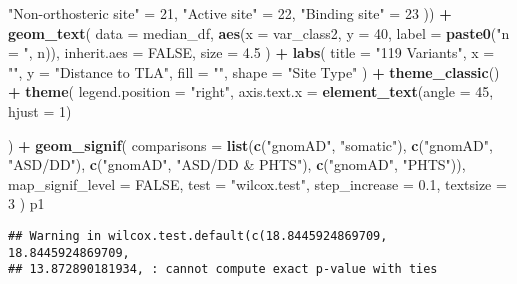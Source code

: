 \documentclass[
]{article}
\newenvironment{Shaded}{\begin{snugshade}}{\end{snugshade}}
\newcommand{\AttributeTok}[1]{\textcolor[rgb]{0.13,0.29,0.53}{#1}}
\newcommand{\ConstantTok}[1]{\textcolor[rgb]{0.56,0.35,0.01}{#1}}
\newcommand{\DecValTok}[1]{\textcolor[rgb]{0.00,0.00,0.81}{#1}}
\newcommand{\FloatTok}[1]{\textcolor[rgb]{0.00,0.00,0.81}{#1}}
\newcommand{\FunctionTok}[1]{\textcolor[rgb]{0.13,0.29,0.53}{\textbf{#1}}}
\newcommand{\NormalTok}[1]{#1}
\newcommand{\OtherTok}[1]{\textcolor[rgb]{0.56,0.35,0.01}{#1}}
\newcommand{\SpecialCharTok}[1]{\textcolor[rgb]{0.81,0.36,0.00}{\textbf{#1}}}
\newcommand{\StringTok}[1]{\textcolor[rgb]{0.31,0.60,0.02}{#1}}
\begin{document}
\begin{Shaded}
\begin{Highlighting}[]
  \StringTok{"Non{-}orthosteric site"} \OtherTok{=} \DecValTok{21}\NormalTok{,}
  \StringTok{"Active site"} \OtherTok{=} \DecValTok{22}\NormalTok{,}
  \StringTok{"Binding site"} \OtherTok{=} \DecValTok{23}
\NormalTok{)) }\SpecialCharTok{+}
  \FunctionTok{geom\_text}\NormalTok{(}
    \AttributeTok{data =}\NormalTok{ median\_df,}
    \FunctionTok{aes}\NormalTok{(}\AttributeTok{x =}\NormalTok{ var\_class2, }\AttributeTok{y =} \DecValTok{40}\NormalTok{, }\AttributeTok{label =} \FunctionTok{paste0}\NormalTok{(}\StringTok{"n = "}\NormalTok{, n)),}
    \AttributeTok{inherit.aes =} \ConstantTok{FALSE}\NormalTok{,}
    \AttributeTok{size =} \FloatTok{4.5}
\NormalTok{  ) }\SpecialCharTok{+}
  \FunctionTok{labs}\NormalTok{(}
    \AttributeTok{title =} \StringTok{"119 Variants"}\NormalTok{,}
    \AttributeTok{x =} \StringTok{""}\NormalTok{,}
    \AttributeTok{y =} \StringTok{"Distance to TLA"}\NormalTok{,}
    \AttributeTok{fill =} \StringTok{""}\NormalTok{,}
    \AttributeTok{shape =} \StringTok{"Site Type"}
\NormalTok{  ) }\SpecialCharTok{+}
  \FunctionTok{theme\_classic}\NormalTok{() }\SpecialCharTok{+}
  \FunctionTok{theme}\NormalTok{(}
    \AttributeTok{legend.position =} \StringTok{"right"}\NormalTok{,}
    \AttributeTok{axis.text.x =} \FunctionTok{element\_text}\NormalTok{(}\AttributeTok{angle =} \DecValTok{45}\NormalTok{, }\AttributeTok{hjust =} \DecValTok{1}\NormalTok{)}

\NormalTok{  ) }\SpecialCharTok{+}
  \FunctionTok{geom\_signif}\NormalTok{(}
    \AttributeTok{comparisons =} \FunctionTok{list}\NormalTok{(}\FunctionTok{c}\NormalTok{(}\StringTok{"gnomAD"}\NormalTok{, }\StringTok{"somatic"}\NormalTok{), }
                       \FunctionTok{c}\NormalTok{(}\StringTok{"gnomAD"}\NormalTok{, }\StringTok{"ASD/DD"}\NormalTok{), }
                       \FunctionTok{c}\NormalTok{(}\StringTok{"gnomAD"}\NormalTok{, }\StringTok{"ASD/DD \& PHTS"}\NormalTok{),}
                       \FunctionTok{c}\NormalTok{(}\StringTok{"gnomAD"}\NormalTok{, }\StringTok{"PHTS"}\NormalTok{)),}
    \AttributeTok{map\_signif\_level =} \ConstantTok{FALSE}\NormalTok{,}
    \AttributeTok{test =} \StringTok{"wilcox.test"}\NormalTok{,}
    \AttributeTok{step\_increase =} \FloatTok{0.1}\NormalTok{,}
    \AttributeTok{textsize =} \DecValTok{3}
\NormalTok{  ) }
\NormalTok{p1}
\end{Highlighting}
\end{Shaded}

\begin{verbatim}
## Warning in wilcox.test.default(c(18.8445924869709, 18.8445924869709,
## 13.872890181934, : cannot compute exact p-value with ties
\end{verbatim}
\end{document}
